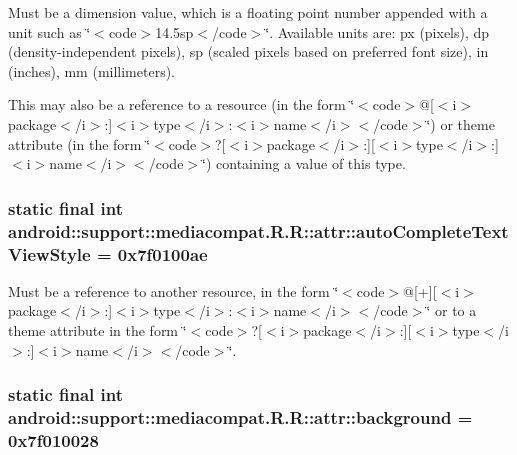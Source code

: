 Must be a dimension value, which is a floating point number appended with a unit such as \char`\"{}$<$code$>$14.5sp$<$/code$>$\char`\"{}. Available units are: px (pixels), dp (density-independent pixels), sp (scaled pixels based on preferred font size), in (inches), mm (millimeters). 

This may also be a reference to a resource (in the form \char`\"{}$<$code$>$@\mbox{[}$<$i$>$package$<$/i$>$:\mbox{]}$<$i$>$type$<$/i$>$:$<$i$>$name$<$/i$>$$<$/code$>$\char`\"{}) or theme attribute (in the form \char`\"{}$<$code$>$?\mbox{[}$<$i$>$package$<$/i$>$:\mbox{]}\mbox{[}$<$i$>$type$<$/i$>$:\mbox{]}$<$i$>$name$<$/i$>$$<$/code$>$\char`\"{}) containing a value of this type. \hypertarget{classandroid_1_1support_1_1mediacompat_1_1_r_1_1attr_4fda73a81a024df52de9b6773b57c03f}{
\subsubsection[{autoCompleteTextViewStyle}]{\setlength{\rightskip}{0pt plus 5cm}static final int android::support::mediacompat.R.R::attr::autoCompleteTextViewStyle = 0x7f0100ae}}
\label{classandroid_1_1support_1_1mediacompat_1_1_r_1_1attr_4fda73a81a024df52de9b6773b57c03f}


Must be a reference to another resource, in the form \char`\"{}$<$code$>$@\mbox{[}+\mbox{]}\mbox{[}$<$i$>$package$<$/i$>$:\mbox{]}$<$i$>$type$<$/i$>$:$<$i$>$name$<$/i$>$$<$/code$>$\char`\"{} or to a theme attribute in the form \char`\"{}$<$code$>$?\mbox{[}$<$i$>$package$<$/i$>$:\mbox{]}\mbox{[}$<$i$>$type$<$/i$>$:\mbox{]}$<$i$>$name$<$/i$>$$<$/code$>$\char`\"{}. \hypertarget{classandroid_1_1support_1_1mediacompat_1_1_r_1_1attr_72bc97f53ba448ff3243174ed8a347fc}{
\subsubsection[{background}]{\setlength{\rightskip}{0pt plus 5cm}static final int android::support::mediacompat.R.R::attr::background = 0x7f010028}}
\label{classandroid_1_1support_1_1mediacompat_1_1_r_1_1attr_72bc97f53ba448ff3243174ed8a347fc}


